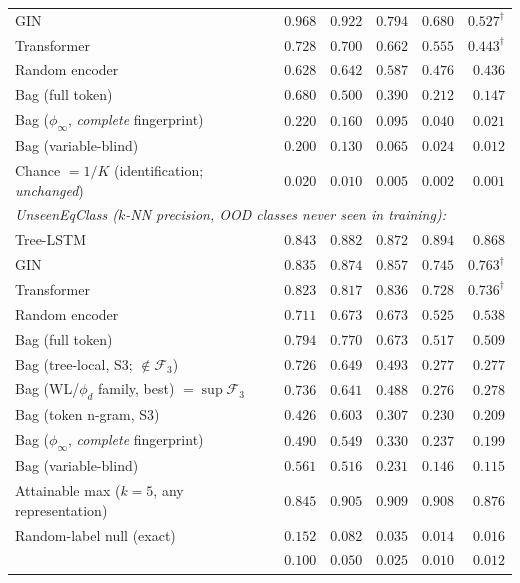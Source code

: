 \begin{table}[h]
\begin{threeparttable}
\begin{tabular}{l rrrrr}
GIN       & $0.968$ & $0.922$ & $0.794$ & $0.680$ & $0.527^{\dagger}$ \\
Transformer & $0.728$ & $0.700$ & $0.662$ & $0.555$ & $0.443^{\dagger}$ \\
Random encoder & $0.628$ & $0.642$ & $0.587$ & $0.476$ & $0.436$ \\
Bag (full token) & $0.680$ & $0.500$ & $0.390$ & $0.212$ & $0.147$ \\
Bag ($\phi_\infty$, \emph{complete} fingerprint) & $0.220$ & $0.160$ & $0.095$ & $0.040$ & $0.021$ \\
Bag (variable-blind) & $0.200$ & $0.130$ & $0.065$ & $0.024$ & $0.012$ \\
Chance $=1/K$ (identification; \emph{unchanged}) & $0.020$ & $0.010$ & $0.005$ & $0.002$ & $0.001$ \\
\midrule
\multicolumn{6}{l}{\emph{UnseenEqClass ($k$-NN precision, OOD classes never seen in training):}} \\
Tree-LSTM & $\mathbf{0.843}$ & $\mathbf{0.882}$ & $\mathbf{0.872}$ & $\mathbf{0.894}$ & $\mathbf{0.868}$ \\
GIN       & $0.835$ & $0.874$ & $0.857$ & $0.745$ & $0.763^{\dagger}$ \\
Transformer & $0.823$ & $0.817$ & $0.836$ & $0.728$ & $0.736^{\dagger}$ \\
Random encoder & $0.711$ & $0.673$ & $0.673$ & $0.525$ & $0.538$ \\
Bag (full token) & $0.794$ & $0.770$ & $0.673$ & $0.517$ & $0.509$ \\
Bag (tree-local, S3; $\notin\mathcal{F}_3$) & $0.726$ & $0.649$ & $0.493$ & $0.277$ & $0.277$ \\
Bag (WL/$\phi_d$ family, best) $=\sup\mathcal{F}_3$ & $0.736$ & $0.641$ & $0.488$ & $0.276$ & $0.278$ \\
Bag (token n-gram, S3) & $0.426$ & $0.603$ & $0.307$ & $0.230$ & $0.209$ \\
Bag ($\phi_\infty$, \emph{complete} fingerprint) & $0.490$ & $0.549$ & $0.330$ & $0.237$ & $0.199$ \\
Bag (variable-blind) & $0.561$ & $0.516$ & $0.231$ & $0.146$ & $0.115$ \\
\midrule
Attainable max ($k{=}5$, any representation) & $0.845$ & $0.905$ & $0.909$ & $0.908$ & $0.876$ \\
Random-label null (exact) & $0.152$ & $0.082$ & $0.035$ & $0.014$ & $0.016$ \\
\;{\scriptsize superseded $1/(\text{unseen classes})$} & {\scriptsize $0.100$} & {\scriptsize $0.050$} & {\scriptsize $0.025$} & {\scriptsize $0.010$} & {\scriptsize $0.012$} \\
\bottomrule
\end{tabular}
\end{threeparttable}
\end{table}


